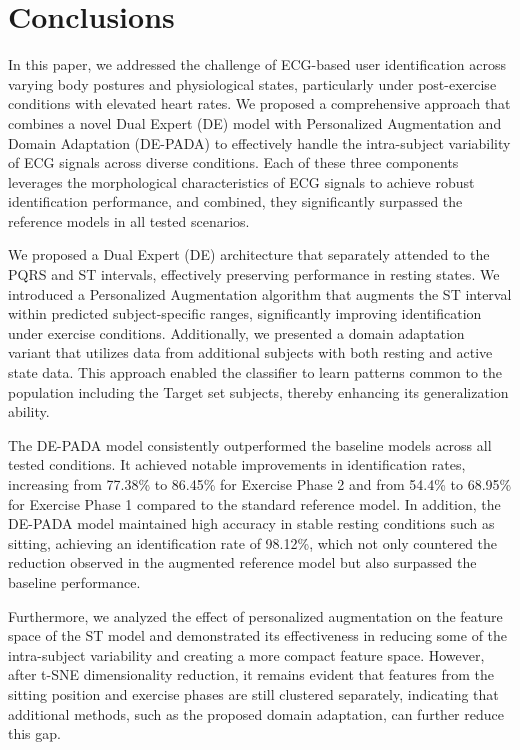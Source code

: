 \section{Conclusions}
In this paper, we addressed the challenge of ECG-based user identification across varying body postures and physiological states, particularly under post-exercise conditions with elevated heart rates. We proposed a comprehensive approach that combines a novel Dual Expert (DE) model with Personalized Augmentation and Domain Adaptation (DE-PADA) to effectively handle the intra-subject variability of ECG signals across diverse conditions. Each of these three components leverages the morphological characteristics of ECG signals to achieve robust identification performance, and combined, they significantly surpassed the reference models in all tested scenarios.

We proposed a Dual Expert (DE) architecture that separately attended to the PQRS and ST intervals, effectively preserving performance in resting states. We introduced a Personalized Augmentation algorithm that augments the ST interval within predicted subject-specific ranges, significantly improving identification under exercise conditions. Additionally, we presented a domain adaptation variant that utilizes data from additional subjects with both resting and active state data. This approach enabled the classifier to learn patterns common to the population including the Target set subjects, thereby enhancing its generalization ability.

The DE-PADA model consistently outperformed the baseline models across all tested conditions. It achieved notable improvements in identification rates, increasing from 77.38\% to 86.45\% for Exercise Phase 2 and from 54.4\% to 68.95\% for Exercise Phase 1 compared to the standard reference model. In addition, the DE-PADA model maintained high accuracy in stable resting conditions such as sitting, achieving an identification rate of 98.12\%, which not only countered the reduction observed in the augmented reference model but also surpassed the baseline performance.

Furthermore, we analyzed the effect of personalized augmentation on the feature space of the ST model and demonstrated its effectiveness in reducing some of the intra-subject variability and creating a more compact feature space. However, after t-SNE dimensionality reduction, it remains evident that features from the sitting position and exercise phases are still clustered separately, indicating that additional methods, such as the proposed domain adaptation, can further reduce this gap.